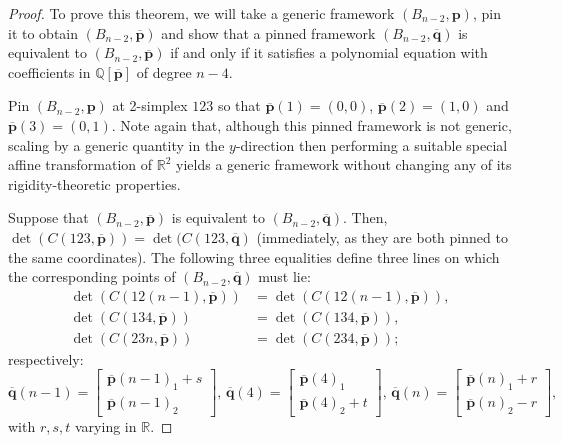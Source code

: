 \documentclass[11pt]{amsart}
\theoremstyle{definition}
\theoremstyle{remark}
\begin{document}
\begin{proof}
    To prove this theorem, we will take a generic framework $(B_{n-2},\mathbf{p})$, pin it to obtain $(B_{n-2},\overline{\mathbf{p}})$ and show that a pinned framework $(B_{n-2},\overline{\mathbf{q}})$ is equivalent to $(B_{n-2},\overline{\mathbf{p}})$ if and only if it satisfies a polynomial equation with coefficients in $\mathbb{Q}[\overline{\mathbf{p}}]$ of degree $n-4$.

    Pin $(B_{n-2},\mathbf{p})$ at 2-simplex $123$ so that $\overline{\mathbf{p}}(1)=(0,0)$, $\overline{\mathbf{p}}(2)=(1,0)$ and $\overline{\mathbf{p}}(3)=(0,1)$.
    Note again that, although this pinned framework is not generic, scaling by a generic quantity in the $y$-direction then performing a suitable special affine transformation of $\mathbb{R}^2$ yields a generic framework without changing any of its rigidity-theoretic properties.

    Suppose that $(B_{n-2},\overline{\mathbf{p}})$ is equivalent to $(B_{n-2},\overline{\mathbf{q}})$.
    Then, $\det(C(123,\overline{\mathbf{p}}))=\det(C(123,\overline{\mathbf{q}})$ (immediately, as they are both pinned to the same coordinates).
    The following three equalities define three lines on which the corresponding points of $(B_{n-2},\overline{\mathbf{q}})$ must lie:
    \begin{equation}
    \begin{split}
        \det(C(12(n-1),\overline{\mathbf{p}})) &= \det(C(12(n-1),\overline{\mathbf{p}})),\\
        \det(C(134,\overline{\mathbf{p}})) &= \det(C(134,\overline{\mathbf{p}})),\\
        \det(C(23n,\overline{\mathbf{p}})) &= \det(C(234,\overline{\mathbf{p}}));
    \end{split}
    \end{equation}
    respectively:
    \begin{equation}\label{eq:bip1}
        \overline{\mathbf{q}}(n-1) = \begin{bmatrix} \overline{\mathbf{p}}(n-1)_1 + s \\ \overline{\mathbf{p}}(n-1)_2 \end{bmatrix}\text{, }
        \overline{\mathbf{q}}(4) = \begin{bmatrix} \overline{\mathbf{p}}(4)_1 \\ \overline{\mathbf{p}}(4)_2 + t\end{bmatrix}\text{, }
        \overline{\mathbf{q}}(n) = \begin{bmatrix} \overline{\mathbf{p}}(n)_1 + r \\ \overline{\mathbf{p}}(n)_2 - r \end{bmatrix},
    \end{equation}
    with $r,s,t$ varying in $\mathbb{R}$.


\end{proof}
\end{document}
